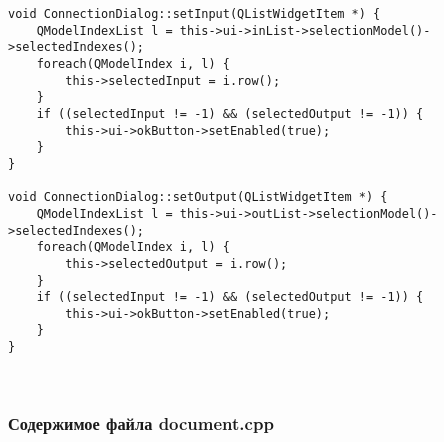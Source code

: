 \begin{lstlisting}
void ConnectionDialog::setInput(QListWidgetItem *) {
    QModelIndexList l = this->ui->inList->selectionModel()->selectedIndexes();
    foreach(QModelIndex i, l) {
        this->selectedInput = i.row();
    }
    if ((selectedInput != -1) && (selectedOutput != -1)) {
        this->ui->okButton->setEnabled(true);
    }
}

void ConnectionDialog::setOutput(QListWidgetItem *) {
    QModelIndexList l = this->ui->outList->selectionModel()->selectedIndexes();
    foreach(QModelIndex i, l) {
        this->selectedOutput = i.row();
    }
    if ((selectedInput != -1) && (selectedOutput != -1)) {
        this->ui->okButton->setEnabled(true);
    }
}
\end{lstlisting}~\\

\subsubsection*{Содержимое файла document.cpp}

